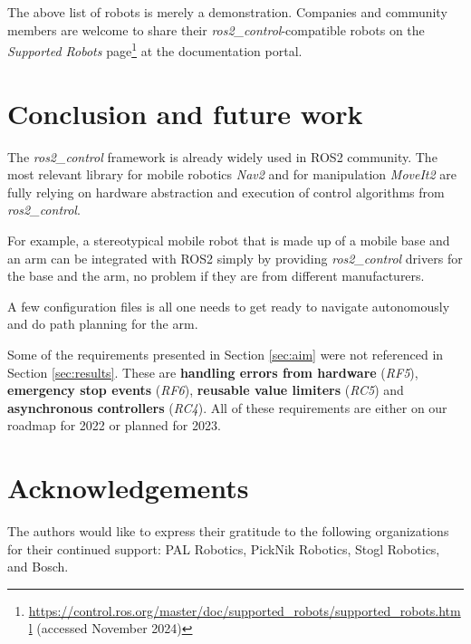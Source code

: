 \documentclass[journal]{IEEEtran}
\begin{document}
The above list of robots is merely a demonstration. Companies and community members are welcome to share their \emph{ros2\_control}-compatible robots on the \emph{Supported Robots} page\footnote{\url{https://control.ros.org/master/doc/supported\_robots/supported\_robots.html} (accessed November 2024)} at the documentation portal.

\section{Conclusion and future work}

The \emph{ros2\_control} framework is already widely used in ROS2 community. The most relevant library for mobile robotics \emph{Nav2} and for manipulation \emph{MoveIt2} are fully relying on hardware abstraction and execution of control algorithms from \emph{ros2\_control}.

For example, a stereotypical mobile robot that is made up of a mobile base and an arm can be integrated with ROS2 simply by providing \emph{ros2\_control} drivers for the base and the arm, no problem if they are from different manufacturers.

A few configuration files is all one needs to get ready to navigate autonomously and do path planning for the arm.

Some of the requirements presented in Section \ref{sec:aim} were not referenced in Section \ref{sec:results}. These are \textbf{handling errors from hardware} (\emph{RF5}), \textbf{emergency stop events} (\emph{RF6}), \textbf{reusable value limiters} (\emph{RC5}) and \textbf{asynchronous controllers} (\emph{RC4}). All of these requirements are either on our roadmap for 2022 or planned for 2023.

\section{Acknowledgements}

The authors would like to express their gratitude to the following organizations for their continued support:
PAL Robotics, PickNik Robotics, Stogl Robotics, and Bosch.


\end{document}
